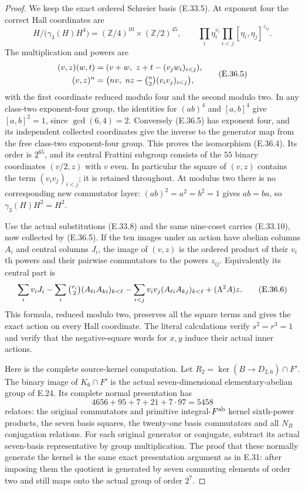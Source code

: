 \begin{proof}
We keep the exact ordered Schreier basis
\textup{(E.33.5)}.  At exponent four the correct
Hall coordinates are
\[
 H/\bigl(\gamma_3(H)H^4\bigr)
       =(\mathbb Z/4)^{10}\times(\mathbb Z/2)^{45},
 \qquad
 \prod_i\eta_i^{v_i}\prod_{i<j}[\eta_i,\eta_j]^{z_{ij}}.
 \tag{E.36.4}
\]
The multiplication and powers are
\[
 \begin{split}
 (v,z)(w,t)&=(v+w,\ z+t-(v_jw_i)_{i<j}),\\
 (v,z)^n&=\bigl(nv,\ nz-\tbinom n2(v_iv_j)_{i<j}\bigr),
 \end{split}
 \tag{E.36.5}
\]
with the first coordinate reduced modulo four and the
second modulo two.  In any class-two exponent-four
group, the identities for $(ab)^4$ and $[a,b]^4$
give $[a,b]^2=1$, since $\gcd(6,4)=2$.
Conversely \textup{(E.36.5)} has exponent four,
and its independent collected coordinates give
the inverse to the generator map from the free
class-two exponent-four group.  This proves the
isomorphism \textup{(E.36.4)}.
Its order is $2^{65}$, and its central Frattini
subgroup consists of the $55$ binary coordinates
$(v/2,z)$ with $v$ even.
In particular the square of $(v,z)$ contains the
term $(v_iv_j)_{i<j}$; it is retained throughout.
At modulus two there is no corresponding new
commutator layer: $(ab)^2=a^2=b^2=1$ gives $ab=ba$,
so $\gamma_3(H)H^2=H^2$.

Use the actual substitutions \textup{(E.33.8)}
and the same nine-coset carries
\textup{(E.33.10)}, now collected by
\textup{(E.36.5)}.  If the ten images under an
action have abelian columns $A_i$ and central
columns $J_i$, the image of $(v,z)$ is the
ordered product of their $v_i$th powers and
their pairwise commutators to the powers $z_{ij}$.
Equivalently its central part is
\[
 \sum_i v_iJ_i
 -\sum_i\tbinom{v_i}{2}
                  (A_{\ell i}A_{ki})_{k<\ell}
 -\sum_{i<j}v_iv_j
                  (A_{\ell i}A_{kj})_{k<\ell}
 +(\Lambda^2A)z .
 \tag{E.36.6}
\]
This formula, reduced modulo two, preserves all
the square terms and gives the exact action on
every Hall coordinate.  The literal calculations
verify $s^2=r^3=1$ and verify that the negative-square
words for $x,y$ induce their actual inner actions.

Here is the complete source-kernel computation.
Let
$R_2=\ker(B\to D_{2,6})\cap F'$.
The binary image of $K_6\cap F'$ is the actual
seven-dimensional elementary-abelian group of
E.24.  Its complete normal presentation has
\[
 4656+95+7+21+7\cdot97=5458
 \tag{E.36.7}
\]
relators: the original commutators and primitive
integral-$F^{\rm ab}$ kernel sixth-power products,
the seven basis squares, the twenty-one basis
commutators and all $N_B$ conjugation relations.
For each original generator or conjugate, subtract
its actual seven-basis representative by group
multiplication.  The proof that these normally
generate the kernel is the same exact presentation
argument as in E.31: after imposing them the
quotient is generated by seven commuting elements
of order two and still maps onto the actual
group of order $2^7$.


\end{proof}
